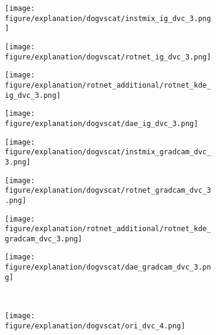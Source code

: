 \documentclass{article} \usepackage{iclr2021_conference,times}
\begin{document}
\begin{figure}[h!]
\begin{subfigure}{.11\textwidth}
\end{subfigure}
\hspace{-2mm}
\begin{subfigure}{.11\textwidth}
  \centering
  \texttt{[image: figure/explanation/dogvscat/instmix\_ig\_dvc\_3.png]}
\end{subfigure}
\hspace{-2mm}
\begin{subfigure}{.11\textwidth}
  \centering
  \texttt{[image: figure/explanation/dogvscat/rotnet\_ig\_dvc\_3.png]}
\end{subfigure}
\hspace{-2mm}
\begin{subfigure}{.11\textwidth}
  \centering
  \texttt{[image: figure/explanation/rotnet\_additional/rotnet\_kde\_ig\_dvc\_3.png]}
\end{subfigure}
\hspace{-2mm}
\begin{subfigure}{.11\textwidth}
  \centering
  \texttt{[image: figure/explanation/dogvscat/dae\_ig\_dvc\_3.png]}
\end{subfigure}
\hspace{-2mm}
\begin{subfigure}{.11\textwidth}
  \centering
  \texttt{[image: figure/explanation/dogvscat/instmix\_gradcam\_dvc\_3.png]}
\end{subfigure}
\hspace{-2mm}
\begin{subfigure}{.11\textwidth}
  \centering
  \texttt{[image: figure/explanation/dogvscat/rotnet\_gradcam\_dvc\_3.png]}
\end{subfigure}
\hspace{-2mm}
\begin{subfigure}{.11\textwidth}
  \centering
  \texttt{[image: figure/explanation/rotnet\_additional/rotnet\_kde\_gradcam\_dvc\_3.png]}
\end{subfigure}
\hspace{-2mm}
\begin{subfigure}{.11\textwidth}
  \centering
  \texttt{[image: figure/explanation/dogvscat/dae\_gradcam\_dvc\_3.png]}
\end{subfigure}\\
\begin{subfigure}{.11\textwidth}
  \centering
  \texttt{[image: figure/explanation/dogvscat/ori\_dvc\_4.png]}
\end{subfigure}

\end{figure}
\end{document}

